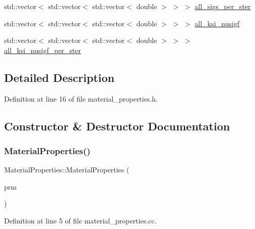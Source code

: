 \begin{DoxyCompactItemize}
\item 
std\+::vector$<$ std\+::vector$<$ std\+::vector$<$ double $>$ $>$ $>$ \hyperlink{class_material_properties_a206fc7b81483c3430de643b4dc6598a4}{all\+\_\+sigs\+\_\+per\+\_\+ster}
\item 
std\+::vector$<$ std\+::vector$<$ std\+::vector$<$ double $>$ $>$ $>$ \hyperlink{class_material_properties_a76c5f9ee2a768ee26cb5ed3c2c78a395}{all\+\_\+ksi\+\_\+nusigf}
\item 
std\+::vector$<$ std\+::vector$<$ std\+::vector$<$ double $>$ $>$ $>$ \hyperlink{class_material_properties_ae44a1ebbeefb9400b02f21ad30086017}{all\+\_\+ksi\+\_\+nusigf\+\_\+per\+\_\+ster}
\end{DoxyCompactItemize}


\subsection{Detailed Description}


Definition at line 16 of file material\+\_\+properties.\+h.



\subsection{Constructor \& Destructor Documentation}
\mbox{\label{class_material_properties_a9c1a2ff5f7cfaacd4b992e96186fbf81}} 
\subsubsection{\texorpdfstring{Material\+Properties()}{MaterialProperties()}}
{\footnotesize\ttfamily Material\+Properties\+::\+Material\+Properties (\begin{DoxyParamCaption}\item[{Parameter\+Handler \&}]{prm }\end{DoxyParamCaption})}



Definition at line 5 of file material\+\_\+properties.\+cc.

\mbox{\label{class_material_properties_aab94335e9db402f624b88603b233bcab}} 
